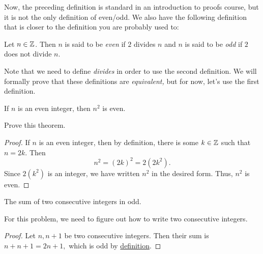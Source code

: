 \documentclass{ximera}
\begin{document}
Now, the preceding definition is standard in an introduction to proofs course, but it is not the only definition of even/odd. We also have the following definition that is closer to the definition you are probably used to:

\begin{defn}\label{defn:even-odd-divides}
  Let $n\in\mathbb Z$. Then $n$ is said to be \emph{even} if $2$ divides $n$ and $n$ is said to be \emph{odd} if $2$ does not divide $n$.
\end{defn}
Note that we need to define \emph{divides} in order to use the second definition. We will formally prove that these definitions are \emph{equivalent,} but for now, let's use the first definition.
 
 
\begin{theorem}\label{thm:even-sq}
  If $n$ is an even integer, then $n^2$ is even.
\end{theorem}

\begin{br}\label{br:sqr-evens}
  Prove this theorem.

  \begin{expandable}
    \begin{proof}
      If $n$ is an even integer, then by definition, there is some $k\in\mathbb Z$ such that $n=2k$. Then \[n^2=(2k)^2=2(2k^2).\] Since $2(k^2)$ is an integer, we have written $n^2$ in the desired form. Thus, $n^2$ is even.
    \end{proof}
  \end{expandable}
  
\end{br}
 
\begin{proposition}\label{thm:sum-odd}
  The sum of two consecutive integers in odd.
\end{proposition}
For this problem, we need to figure out how to write two consecutive integers. 
\begin{proof}
  Let $n,n+1$ be two consecutive integers. Then their sum is $n+n+1=2n+1,$ which is odd by \hyperref[defn:even-odd-form]{definition}.
\end{proof}
\end{document}
